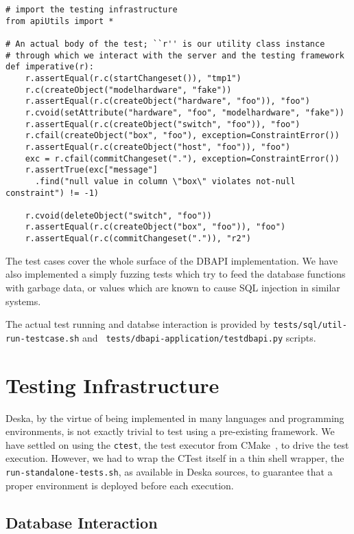 \documentclass[deska]{subfiles}
\begin{document}
\begin{verbatim}
# import the testing infrastructure
from apiUtils import *

# An actual body of the test; ``r'' is our utility class instance
# through which we interact with the server and the testing framework
def imperative(r):
    r.assertEqual(r.c(startChangeset()), "tmp1")
    r.c(createObject("modelhardware", "fake"))
    r.assertEqual(r.c(createObject("hardware", "foo")), "foo")
    r.cvoid(setAttribute("hardware", "foo", "modelhardware", "fake"))
    r.assertEqual(r.c(createObject("switch", "foo")), "foo")
    r.cfail(createObject("box", "foo"), exception=ConstraintError())
    r.assertEqual(r.c(createObject("host", "foo")), "foo")
    exc = r.cfail(commitChangeset("."), exception=ConstraintError())
    r.assertTrue(exc["message"]
      .find("null value in column \"box\" violates not-null constraint") != -1)

    r.cvoid(deleteObject("switch", "foo"))
    r.assertEqual(r.c(createObject("box", "foo")), "foo")
    r.assertEqual(r.c(commitChangeset(".")), "r2")
\end{verbatim}

The test cases cover the whole surface of the DBAPI implementation.  We have also implemented a simply fuzzing tests
which try to feed the database functions with garbage data, or values which are known to cause SQL injection in similar
systems.

The actual test running and databse interaction is provided by {\tt tests/sql/util-run-testcase.sh} and {\tt
tests/dbapi-application/testdbapi.py} scripts.

\section{Testing Infrastructure}

Deska, by the virtue of being implemented in many languages and programming environments, is not exactly trivial to test
using a pre-existing framework.  We have settled on using the {\tt ctest}, the test executor from CMake~\cite{cmake}, to
drive the test execution.  However, we had to wrap the CTest itself in a thin shell wrapper, the {\tt
run-standalone-tests.sh}, as available in Deska sources, to guarantee that a proper environment is deployed before each
execution.

\subsection{Database Interaction}
\end{document}
